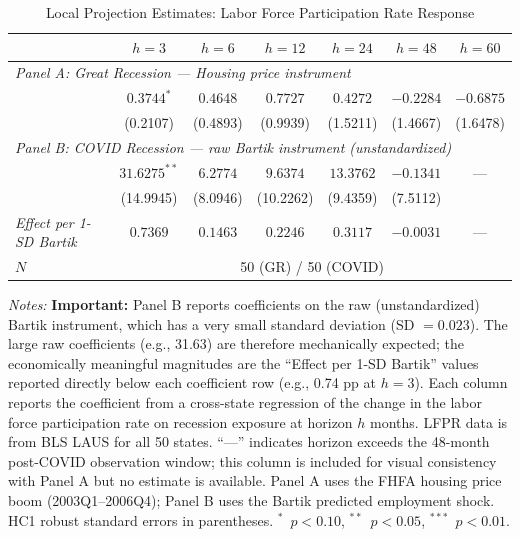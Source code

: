 \documentclass[12pt]{article}
\begin{document}
\begin{table}[H]
\centering
\caption{Local Projection Estimates: Labor Force Participation Rate Response}
\label{tab:app_lfpr_lp}
\begin{threeparttable}
\small
\begin{tabular}{lcccccc}
\toprule
& $h=3$ & $h=6$ & $h=12$ & $h=24$ & $h=48$ & $h=60$ \\
\midrule
\multicolumn{7}{l}{\textit{Panel A: Great Recession --- Housing price instrument}} \\[3pt]
& $0.3744^{*}$ & $0.4648$ & $0.7727$ & $0.4272$ & $-0.2284$ & $-0.6875$ \\
& (0.2107) & (0.4893) & (0.9939) & (1.5211) & (1.4667) & (1.6478) \\
\midrule
\multicolumn{7}{l}{\textit{Panel B: COVID Recession --- raw Bartik instrument (unstandardized)}} \\[3pt]
& $31.6275^{**}$ & $6.2774$ & $9.6374$ & $13.3762$ & $-0.1341$ & --- \\
& (14.9945) & (8.0946) & (10.2262) & (9.4359) & (7.5112) & \\
\textit{Effect per 1-SD Bartik} & $0.7369$ & $0.1463$ & $0.2246$ & $0.3117$ & $-0.0031$ & --- \\
\midrule
$N$ & \multicolumn{6}{c}{50 (GR) / 50 (COVID)} \\
\bottomrule
\end{tabular}
\begin{tablenotes}[flushleft]
\small
\item \textit{Notes:} \textbf{Important:} Panel B reports coefficients on the raw (unstandardized) Bartik instrument, which has a very small standard deviation (SD $= 0.023$). The large raw coefficients (e.g., 31.63) are therefore mechanically expected; the economically meaningful magnitudes are the ``Effect per 1-SD Bartik'' values reported directly below each coefficient row (e.g., 0.74 pp at $h=3$). Each column reports the coefficient from a cross-state regression of the change in the labor force participation rate on recession exposure at horizon $h$ months. LFPR data is from BLS LAUS for all 50 states. ``---'' indicates horizon exceeds the 48-month post-COVID observation window; this column is included for visual consistency with Panel A but no estimate is available. Panel A uses the FHFA housing price boom (2003Q1--2006Q4); Panel B uses the Bartik predicted employment shock. HC1 robust standard errors in parentheses. $^{*}$~$p<0.10$, $^{**}$~$p<0.05$, $^{***}$~$p<0.01$.
\end{tablenotes}
\end{threeparttable}
\end{table}
\end{document}
